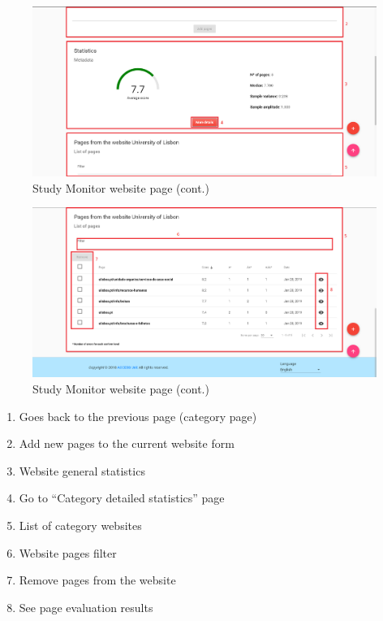 \clearpage

\begin{figure}[H]
    \centering
    \includegraphics[width=\linewidth]{lib/images/study/study_website_page_2.png}
    \caption{Study Monitor website page (cont.)}
    \label{fig:study_website_page_2}
\end{figure}

\begin{figure}[H]
    \centering
    \includegraphics[width=\linewidth]{lib/images/study/study_website_page_3.png}
    \caption{Study Monitor website page (cont.)}
    \label{fig:study_website_page_3}
\end{figure}

\begin{enumerate}
    \item Goes back to the previous page (category page)
    \item Add new pages to the current website form
    \item Website general statistics
    \item Go to ``Category detailed statistics'' page
    \item List of category websites
    \item Website pages filter
    \item Remove pages from the website
    \item See page evaluation results
\end{enumerate}

